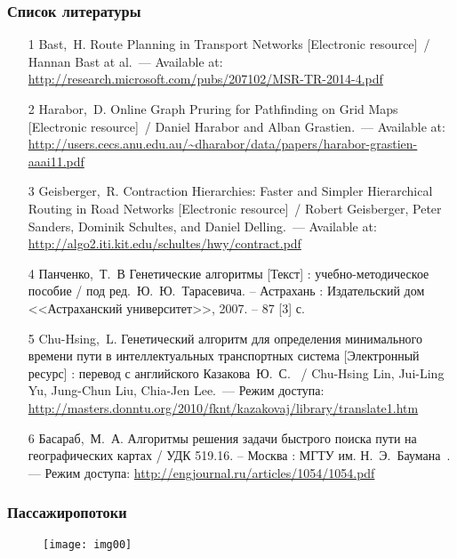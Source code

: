 \begin{frame}
    \frametitle{Список литературы}
    \begin{enumerate}
        \scriptsize
        \item[1] Bast,~H. Route Planning in Transport Networks [Electronic resource]~/ 
            Hannan Bast at al.~--- Available at:
            \url{http://research.microsoft.com/pubs/207102/MSR-TR-2014-4.pdf}\\
        \item[2] Harabor,~D. Online Graph Pruring for Pathfinding on Grid Maps [Electronic resource]~/ 
            Daniel Harabor and Alban Grastien.~--- Available at:
            \url{http://users.cecs.anu.edu.au/~dharabor/data/papers/harabor-grastien-aaai11.pdf}\\
        \item[3] Geisberger,~R. Contraction Hierarchies: Faster and Simpler Hierarchical Routing in Road 
            Networks [Electronic resource]~/ Robert Geisberger, Peter Sanders, Dominik Schultes, and 
            Daniel Delling.~--- Available at:
            \url{http://algo2.iti.kit.edu/schultes/hwy/contract.pdf}\\
        \item[4] Панченко,~Т.~В Генетические алгоритмы [Текст] : учебно-методическое пособие / под 
            ред.~Ю.~Ю.~Тарасевича. -- Астрахань : Издательский дом <<Астраханский университет>>, 2007. -- 
            87 [3] с.\\
        \item[5] Chu-Hsing,~L. Генетический алгоритм для определения минимального времени пути в 
            интеллектуальных транспортных система [Электронный ресурс] : перевод с английского 
            Казакова~Ю.~С. ~/ Chu-Hsing Lin, Jui-Ling Yu, Jung-Chun Liu, Chia-Jen Lee.~--- 
            Режим доступа:
        \url{http://masters.donntu.org/2010/fknt/kazakovaj/library/translate1.htm}
        \item[6] Басараб,~М.~А. Алгоритмы решения задачи быстрого поиска пути на географических картах / 
            УДК 519.16. -- Москва : МГТУ им. Н.~Э.~Баумана~.--- Режим доступа:
            \url{http://engjournal.ru/articles/1054/1054.pdf}
    \end{enumerate}
\end{frame}

\begin{frame}
    \frametitle{Пассажиропотоки}
    \begin{figure}
        \center
        \texttt{[image: img00]}
    \end{figure}
\end{frame}

